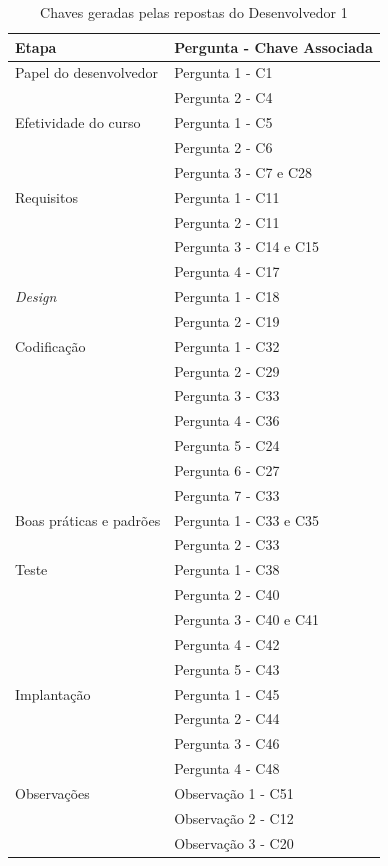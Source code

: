 \begin{table}[h]
	\centering
	\begin{tabular}{|m{4.8cm} | m{4.8cm} |}
		\hline
		\textbf{Etapa} & \textbf{Pergunta - Chave Associada} \\ \hline
		Papel do desenvolvedor & Pergunta 1 - C1 \\ \cline{2-2}
		& Pergunta 2 - C4 \\ \cline{2-2}
		\hline
		Efetividade do curso & Pergunta 1 - C5 \\ \cline{2-2}
		& Pergunta 2 - C6 \\ \cline{2-2}
		& Pergunta 3 - C7 e C28 \\ \cline{2-2}
		\hline
		Requisitos & Pergunta 1 - C11 \\ \cline{2-2}
		 & Pergunta 2 - C11 \\ \cline{2-2}
		& Pergunta 3 - C14 e C15 \\ \cline{2-2}
		& Pergunta 4 - C17 \\ \cline{2-2}
		 \hline
		\textit{Design} & Pergunta 1 - C18 \\ \cline{2-2}
		& Pergunta 2 - C19 \\ \cline{2-2}
		 \hline
		Codificação & Pergunta 1 - C32 \\ \cline{2-2}
		& Pergunta 2 - C29 \\ \cline{2-2}
		& Pergunta 3 - C33 \\ \cline{2-2}
		& Pergunta 4 - C36 \\ \cline{2-2}
		& Pergunta 5 - C24 \\ \cline{2-2}
		& Pergunta 6 - C27 \\ \cline{2-2}
		& Pergunta 7 - C33 \\ \cline{2-2} \hline
		Boas práticas e padrões & Pergunta 1 - C33 e C35 \\ \cline{2-2}
		& Pergunta 2 - C33 \\ \cline{2-2}
		\hline
		Teste & Pergunta 1 - C38 \\ \cline{2-2}
		& Pergunta 2 - C40 \\ \cline{2-2}
		& Pergunta 3 - C40 e C41 \\ \cline{2-2}
		& Pergunta 4 - C42 \\ \cline{2-2}
		& Pergunta 5 - C43 \\ \cline{2-2}
		\hline
		Implantação & Pergunta 1 - C45 \\ \cline{2-2}
		& Pergunta 2 - C44 \\ \cline{2-2}
		& Pergunta 3 - C46 \\ \cline{2-2}
		& Pergunta 4 - C48 \\ \cline{2-2}
		\hline
		Observações & Observação 1 - C51 \\ \cline{2-2} 
		& Observação 2 - C12 \\ \cline{2-2} 
		& Observação 3 - C20 \\
		\hline
	\end{tabular}

	\caption{Chaves geradas pelas repostas do Desenvolvedor 1}
	\label{tab02}
\end{table}

